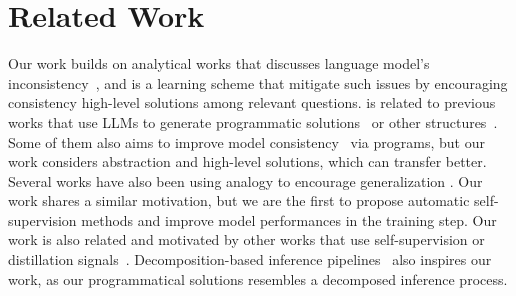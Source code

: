 \section{Related Work}
Our work builds on analytical works that discusses language model's inconsistency~\cite{tang2023large, Li2023Deceiving, li2024famicom, mirzadeh2024gsm}, and \framework{} is a learning scheme that mitigate such issues by encouraging consistency high-level solutions among relevant questions. \framework{} is related to previous works that use LLMs to generate programmatic solutions~\cite{chen2022program, gao2023pal} or other structures~\cite{feng2024bird}. Some of them also aims to improve model consistency~\cite{lyu2023faithful} via programs, but our work considers abstraction and high-level solutions, which can transfer better. Several works have also been using analogy to encourage generalization \cite{Hu2023InContextAR, Yasunaga2023LargeLM, Yuan2023ANALOGYKBUA, Zhou2023Symbolic}. Our work shares a similar motivation, but we are the first to propose automatic self-supervision methods and improve model performances in the training step. Our work is also related and motivated by other works that use self-supervision or distillation signals~\cite{zhu2024pad, zelikman2024quiet}. Decomposition-based inference pipelines~\cite{khattab2022demonstrate, hao2023reasoning, yaoreact} also inspires our work, as our programmatical solutions resembles a decomposed inference process.

